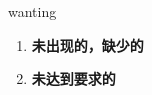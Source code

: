 
\begin{frame}
{\huge wanting}
\begin{center}
\begin{enumerate}\Large
  \item \textbf{未出现的，缺少的}
  \item \textbf{未达到要求的}
\end{enumerate}
\end{center}
\end{frame}
